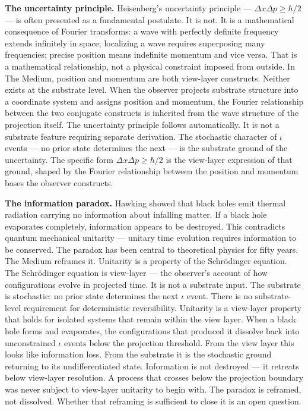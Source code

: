 \documentclass[11pt,letterpaper]{article}
\begin{document}
\textbf{The uncertainty principle.} Heisenberg's uncertainty principle --- \(\Delta x \Delta p \geq \hbar/2\) --- is often presented as a fundamental postulate. It is not. It is a mathematical consequence of Fourier transforms: a wave with perfectly definite frequency extends infinitely in space; localizing a wave requires superposing many frequencies; precise position means indefinite momentum and vice versa. That is a mathematical relationship, not a physical constraint imposed from outside. In The Medium, position and momentum are both view-layer constructs. Neither exists at the substrate level. When the observer projects substrate structure into a coordinate system and assigns position and momentum, the Fourier relationship between the two conjugate constructs is inherited from the wave structure of the projection itself. The uncertainty principle follows automatically. It is not a substrate feature requiring separate derivation. The stochastic character of \(\iota\) events --- no prior state determines the next --- is the substrate ground of the uncertainty. The specific form \(\Delta x \Delta p \geq \hbar/2\) is the view-layer expression of that ground, shaped by the Fourier relationship between the position and momentum bases the observer constructs.

\textbf{The information paradox.} Hawking showed that black holes emit thermal radiation carrying no information about infalling matter. If a black hole evaporates completely, information appears to be destroyed. This contradicts quantum mechanical unitarity --- unitary time evolution requires information to be conserved. The paradox has been central to theoretical physics for fifty years. The Medium reframes it. Unitarity is a property of the Schrödinger equation. The Schrödinger equation is view-layer --- the observer's account of how configurations evolve in projected time. It is not a substrate input. The substrate is stochastic: no prior state determines the next \(\iota\) event. There is no substrate-level requirement for deterministic reversibility. Unitarity is a view-layer property that holds for isolated systems that remain within the view layer. When a black hole forms and evaporates, the configurations that produced it dissolve back into unconstrained \(\iota\) events below the projection threshold. From the view layer this looks like information loss. From the substrate it is the stochastic ground returning to its undifferentiated state. Information is not destroyed --- it retreats below view-layer resolution. A process that crosses below the projection boundary was never subject to view-layer unitarity to begin with. The paradox is reframed, not dissolved. Whether that reframing is sufficient to close it is an open question.
\end{document}
